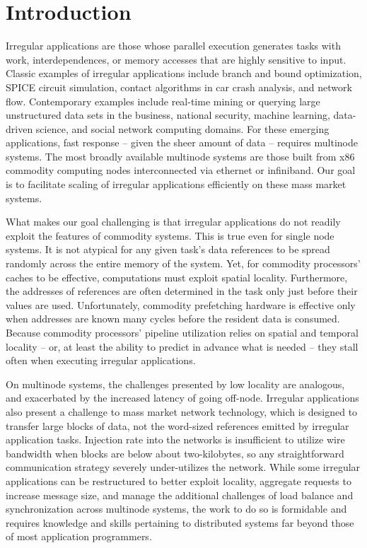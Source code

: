 \section{Introduction} \label{sec:intro}

Irregular applications are those whose parallel execution generates tasks with work, interdependences, or memory accesses that are highly sensitive to input.  Classic examples of irregular applications include branch and bound optimization, SPICE circuit simulation, contact algorithms in car crash analysis, and network flow.  Contemporary examples include real-time mining or querying large unstructured data sets in the business, national security, machine learning, data-driven science, and social network computing domains.  For these emerging applications, fast response -- given the sheer amount of data -- requires multinode systems.  The most broadly available multinode systems are those built from x86 commodity computing nodes interconnected via ethernet or infiniband.  Our goal is to facilitate scaling of irregular applications efficiently on these mass market systems.

What makes our goal challenging is that irregular applications do not readily exploit the features of commodity systems.  This is true even for single node systems.  It is not atypical for any given task's data references to be spread randomly across the entire memory of the system. Yet, for commodity processors' caches to be effective, computations must exploit spatial locality.  Furthermore, the addresses of references are often determined in the task only just before their values are used.  Unfortunately, commodity prefetching hardware is effective only when addresses are known many cycles before the resident data is consumed.  Because commodity processors' pipeline utilization relies on spatial and temporal locality -- or, at least the ability to predict in advance what is needed -- they stall often when executing irregular applications.

On multinode systems, the challenges presented by low locality are analogous, and exacerbated by the increased latency of going off-node.  Irregular applications also present a challenge to mass market network technology, which is designed to transfer large blocks of data, not the word-sized references emitted by irregular application tasks.  Injection rate into the networks is insufficient to utilize wire bandwidth when blocks are below about two-kilobytes, so any straightforward communication strategy severely under-utilizes the network.  While some irregular applications can be restructured to better exploit locality, aggregate requests to increase message size, and manage the additional challenges of load balance and synchronization across multinode systems, the work to do so is formidable and requires knowledge and skills pertaining to distributed systems far beyond those of most application programmers.

